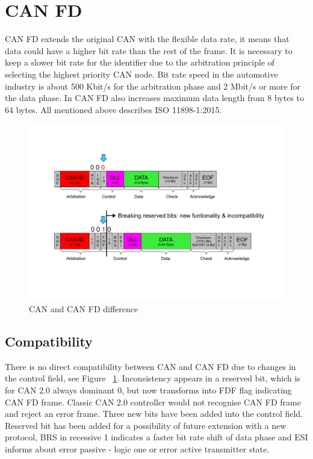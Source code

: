 \documentclass{ctuthesis}
\begin{document}
 \section{CAN FD}
  CAN FD extends the original CAN with the flexible data rate, it means that data could have a higher bit rate than the rest of the frame. It is necessary to keep a slower bit rate for the identifier due to the arbitration principle of selecting the highest priority CAN node\cite{priority_can}. Bit rate speed in the automotive industry is about 500 Kbit/s for the arbitration phase and 2 Mbit/s or more for the data phase. In CAN FD also increases maximum data length from 8 bytes to 64 bytes. All mentioned above describes ISO 11898-1:2015.
  \begin{figure}[H]
  \includegraphics[width=1\textwidth]{agl2017-socketcan-can_fd}
  \caption{CAN and CAN FD difference \cite{canfd}}
  \label{fig:cancanfddifference}
  \end{figure}
  \subsection{Compatibility}
   There is no direct compatibility between CAN and CAN FD due to changes in the control field, see Figure ~\ref{fig:cancanfddifference}. Inconsistency appears in a reserved bit, which is for CAN 2.0 always dominant 0, but now transforms into FDF flag indicating CAN FD frame. Classic CAN 2.0 controller would not recognise CAN FD frame and reject an error frame. Three new bits have been added into the control field. Reserved bit has been added for a possibility of future extension with a new protocol, BRS in recessive 1 indicates a faster bit rate shift of data phase and ESI informs about error passive - logic one or error active transmitter state.
\end{document}
